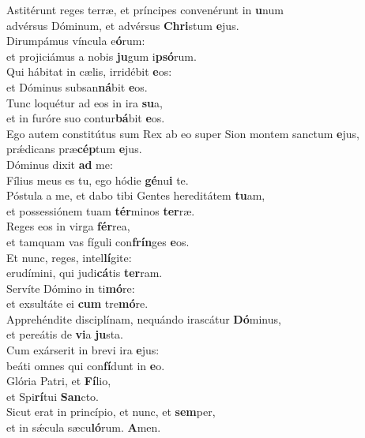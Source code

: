 \evenverse Astitérunt reges terræ, et príncipes convenérunt in \textbf{u}num~\*\\
\evenverse advérsus Dóminum, et advérsus \textbf{Chri}stum \textbf{e}jus.\\
\oddverse Dirumpámus víncula e\textbf{ó}rum:~\*\\
\oddverse et projiciámus a nobis \textbf{ju}gum i\textbf{psó}rum.\\
\evenverse Qui hábitat in cælis, irridébit \textbf{e}os:~\*\\
\evenverse et Dóminus subsan\textbf{ná}bit \textbf{e}os.\\
\oddverse Tunc loquétur ad eos in ira \textbf{su}a,~\*\\
\oddverse et in furóre suo contur\textbf{bá}bit \textbf{e}os.\\
\evenverse Ego autem constitútus sum Rex ab eo super Sion montem sanctum \textbf{e}jus,~\*\\
\evenverse prǽdicans præ\textbf{cép}tum \textbf{e}jus.\\
\oddverse Dóminus dixit \textbf{ad} me:~\*\\
\oddverse Fílius meus es tu, ego hódie \textbf{gé}nu\textbf{i} te.\\
\evenverse Póstula a me, et dabo tibi Gentes hereditátem \textbf{tu}am,~\*\\
\evenverse et possessiónem tuam \textbf{tér}minos \textbf{ter}ræ.\\
\oddverse Reges eos in virga \textbf{fér}rea,~\*\\
\oddverse et tamquam vas fíguli con\textbf{frín}ges \textbf{e}os.\\
\evenverse Et nunc, reges, intel\textbf{lí}gite:~\*\\
\evenverse erudímini, qui judi\textbf{cá}tis \textbf{ter}ram.\\
\oddverse Servíte Dómino in ti\textbf{mó}re:~\*\\
\oddverse et exsultáte ei \textbf{cum} tre\textbf{mó}re.\\
\evenverse Apprehéndite disciplínam, nequándo irascátur \textbf{Dó}minus,~\*\\
\evenverse et pereátis de \textbf{vi}a \textbf{ju}sta.\\
\oddverse Cum exárserit in brevi ira \textbf{e}jus:~\*\\
\oddverse beáti omnes qui con\textbf{fí}dunt in \textbf{e}o.\\
\evenverse Glória Patri, et \textbf{Fí}lio,~\*\\
\evenverse et Spi\textbf{rí}tui \textbf{San}cto.\\
\oddverse Sicut erat in princípio, et nunc, et \textbf{sem}per,~\*\\
\oddverse et in sǽcula sæcu\textbf{ló}rum. \textbf{A}men.\\
